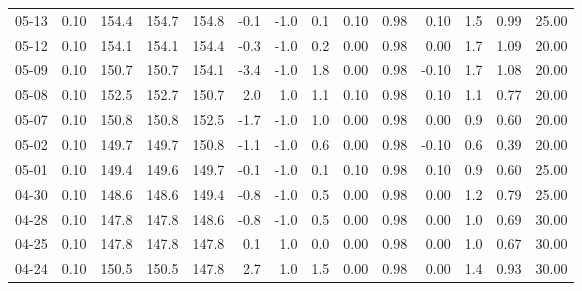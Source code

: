 \begin{threeparttable}
{\begin{tabular}{lrrrrrrrrrrrrr}
  05-13 &     0.10 & 154.4 & 154.7 & 154.8 &       -0.1 &                     -1.0 &                 0.1 &       0.10 &      0.98 &           0.10 &              1.5 &            0.99 &                  25.00 \\
  05-12 &     0.10 & 154.1 & 154.1 & 154.4 &       -0.3 &                     -1.0 &                 0.2 &       0.00 &      0.98 &           0.00 &              1.7 &            1.09 &                  20.00 \\
  05-09 &     0.10 & 150.7 & 150.7 & 154.1 &       -3.4 &                     -1.0 &                 1.8 &       0.00 &      0.98 &          -0.10 &              1.7 &            1.08 &                  20.00 \\
  05-08 &     0.10 & 152.5 & 152.7 & 150.7 &        2.0 &                      1.0 &                 1.1 &       0.10 &      0.98 &           0.10 &              1.1 &            0.77 &                  20.00 \\
  05-07 &     0.10 & 150.8 & 150.8 & 152.5 &       -1.7 &                     -1.0 &                 1.0 &       0.00 &      0.98 &           0.00 &              0.9 &            0.60 &                  20.00 \\
  05-02 &     0.10 & 149.7 & 149.7 & 150.8 &       -1.1 &                     -1.0 &                 0.6 &       0.00 &      0.98 &          -0.10 &              0.6 &            0.39 &                  20.00 \\
  05-01 &     0.10 & 149.4 & 149.6 & 149.7 &       -0.1 &                     -1.0 &                 0.1 &       0.10 &      0.98 &           0.10 &              0.9 &            0.60 &                  25.00 \\
  04-30 &     0.10 & 148.6 & 148.6 & 149.4 &       -0.8 &                     -1.0 &                 0.5 &       0.00 &      0.98 &           0.00 &              1.2 &            0.79 &                  25.00 \\
  04-28 &     0.10 & 147.8 & 147.8 & 148.6 &       -0.8 &                     -1.0 &                 0.5 &       0.00 &      0.98 &           0.00 &              1.0 &            0.69 &                  30.00 \\
  04-25 &     0.10 & 147.8 & 147.8 & 147.8 &        0.1 &                      1.0 &                 0.0 &       0.00 &      0.98 &           0.00 &              1.0 &            0.67 &                  30.00 \\
  04-24 &     0.10 & 150.5 & 150.5 & 147.8 &        2.7 &                      1.0 &                 1.5 &       0.00 &      0.98 &           0.00 &              1.4 &            0.93 &                  30.00 \\

\end{tabular}}
\end{threeparttable}
